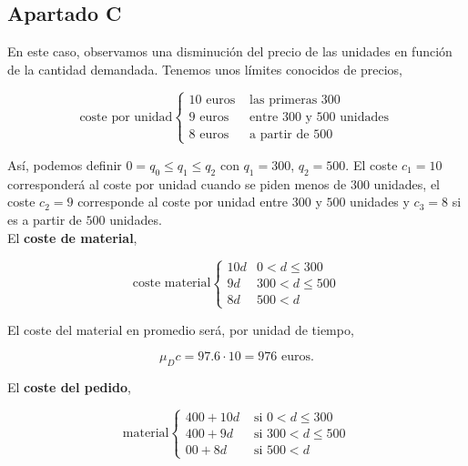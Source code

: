 \documentclass[a4paper,12pt]{article}
\begin{document}
\pagebreak

\subsection{Apartado C}

En este caso, observamos una disminuci\'on del precio de las unidades en funci\'on de la cantidad demandada. Tenemos unos l\'imites conocidos de precios,
     
	\begin{equation*}
	\text{coste por unidad}  \left\lbrace \begin{array}{ll}	  
		10\text{ euros} & \text{ las primeras 300}\\
		9\text{ euros}  & \text{ entre 300 y 500 unidades}\\
		8\text{ euros}  & \text{ a partir de 500}
	\end{array}
	\right. 
	\end{equation*}
	
As\'i, podemos definir $0 = q_0 \leq q_1 \leq q_2$ con $q_1 = 300$, $q_2 = 500$. El coste $c_1 = 10$ corresponder\'a al coste por unidad cuando se piden menos de $300$ unidades, el coste $c_2 = 9$ corresponde al coste por unidad entre $300$ y $500$ unidades y $c_3 = 8$ si es a partir de $500$ unidades.\\

El \textbf{coste de material},

\begin{equation*}
\text{coste material} \left\lbrace \begin{array}{ll}
	10d & 0 < d \leq 300\\
	9d  & 300 < d \leq 500 \\
	8d  & 500 < d
\end{array}
	\right.
\end{equation*}

El coste del material en promedio ser\'a, por unidad de tiempo, 

$$ \mu_D c = 97.6 \cdot 10 = 976\text{ euros.}$$ 

El \textbf{coste del pedido},

\begin{equation*}
\text{material} \left\lbrace \begin{array}{ll}
	400 + 10d & \text{ si } 0 < d \leq 300\\
	400 + 9d  & \text{ si } 300 < d \leq 500 \\
	00 + 8d   & \text{ si } 500 < d
\end{array}
	\right.
\end{equation*}
\end{document}
